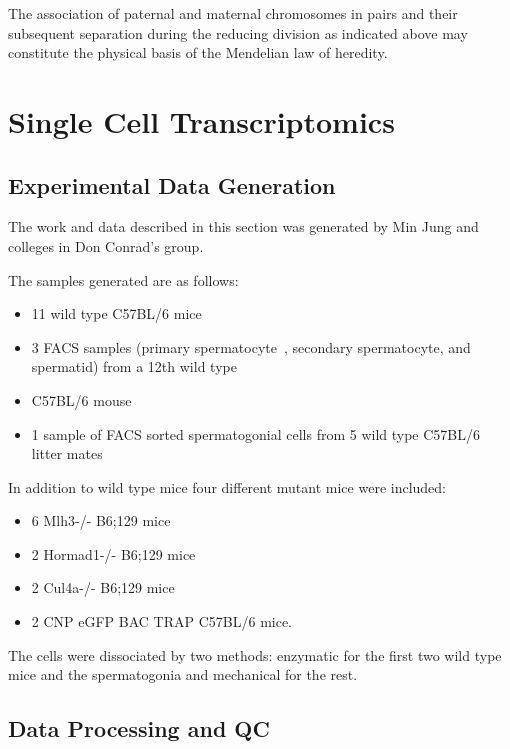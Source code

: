 \begin{savequote}[8cm]
The association of paternal and maternal chromosomes in pairs and their subsequent separation during the reducing division as indicated above may constitute the physical basis of the Mendelian law of heredity.
\end{savequote}

\chapter{\label{ch:2-SDA} Single Cell Transcriptomics}

\minitoc

\section{Experimental Data Generation}

The work and data described in this section was generated by Min Jung and colleges in Don Conrad's group.

The samples generated are as follows:

\begin{itemize}
	\item 11 wild type C57BL/6 mice
	\item 3 FACS samples (primary spermatocyte , secondary spermatocyte, and spermatid) from a 12th wild type
	\item C57BL/6 mouse
	\item 1 sample of FACS sorted spermatogonial cells from 5 wild type C57BL/6 litter mates
\end{itemize}

In addition to wild type mice four different mutant mice were included:
\begin{itemize}
	\item 6 Mlh3-/- B6;129 mice
	\item 2 Hormad1-/- B6;129 mice
	\item 2 Cul4a-/- B6;129 mice
	\item 2 CNP eGFP BAC TRAP C57BL/6 mice.
\end{itemize}

The cells were dissociated by two methods: enzymatic for the first two wild type mice and the spermatogonia and mechanical for the rest.

\section{Data Processing and QC}

